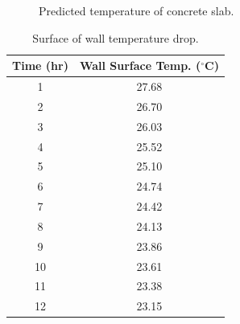 \documentclass[titlepage,11pt]{article}
\begin{document}
\begin{figure}[!h]
  \begin{center}
  \caption{Predicted temperature of concrete slab.}
  \end{center}
\end{figure}

\newpage
\begin{table}[h]
\caption{Surface of wall temperature drop.}
\begin{center}
\begin{tabular}{|c|c|}
\hline {\bf Time (hr)} & {\bf Wall Surface Temp. ($^\circ$C)}\\
\hline 1 & 27.68 \\
\hline 2 & 26.70 \\
\hline 3 & 26.03 \\
\hline 4 & 25.52 \\
\hline 5 & 25.10 \\
\hline 6 & 24.74 \\
\hline 7 & 24.42 \\
\hline 8 & 24.13 \\
\hline 9 & 23.86 \\
\hline 10 & 23.61 \\
\hline 11 & 23.38 \\
\hline 12 & 23.15\\
\hline
\end{tabular}
\end{center}
\end{table}
\end{document}
